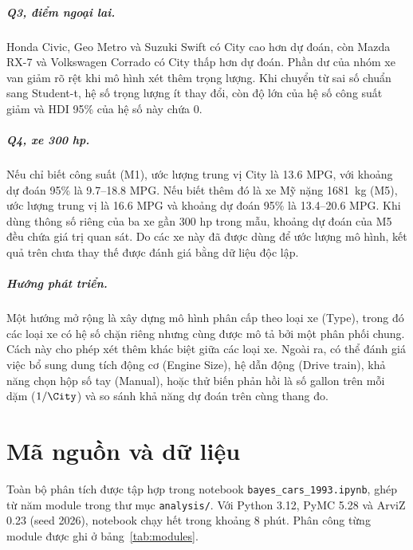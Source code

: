 \documentclass[12pt,a4paper]{report}
\begin{document}
\paragraph{Q3, điểm ngoại lai.} Honda Civic, Geo Metro và Suzuki Swift có City
cao hơn dự đoán, còn Mazda RX-7 và Volkswagen Corrado có City thấp hơn dự đoán.
Phần dư của nhóm xe van giảm rõ rệt khi mô hình xét thêm trọng lượng. Khi
chuyển từ sai số chuẩn sang Student-t, hệ số trọng lượng ít thay đổi, còn độ
lớn của hệ số công suất giảm và HDI 95\% của hệ số này chứa 0.

\paragraph{Q4, xe 300 hp.} Nếu chỉ biết công suất (M1), ước lượng trung vị City
là \num{13.6} MPG, với khoảng dự đoán 95\% là \num{9.7}--\num{18.8} MPG.
Nếu biết thêm đó là xe Mỹ nặng \SI{1681}{kg} (M5), ước lượng trung vị là
\num{16.6} MPG và khoảng dự đoán 95\% là \num{13.4}--\num{20.6} MPG. Khi dùng
thông số riêng của ba xe gần 300 hp trong mẫu, khoảng dự đoán của M5 đều chứa
giá trị quan sát. Do các xe này đã được dùng để ước lượng mô hình, kết quả trên
chưa thay thế được đánh giá bằng dữ liệu độc lập.

\paragraph{Hướng phát triển.} Một hướng mở rộng là xây dựng mô hình phân cấp theo
loại xe (Type), trong đó các loại xe có hệ số chặn riêng nhưng cùng được mô
tả bởi một phân phối chung. Cách này cho phép xét thêm khác biệt giữa các loại
xe. Ngoài ra, có thể đánh giá việc bổ sung dung tích động cơ (Engine Size), hệ
dẫn động (Drive train), khả năng chọn hộp số tay (Manual), hoặc thử biến phản
hồi là số gallon trên mỗi dặm ($1/\City$) và so sánh khả năng dự đoán trên cùng
thang đo.

\appendix

\chapter{Mã nguồn và dữ liệu}
\label{sec:appendix}

Toàn bộ phân tích được tập hợp trong notebook \texttt{bayes\_cars\_1993.ipynb},
ghép từ năm module trong thư mục \texttt{analysis/}. Với Python 3.12, PyMC 5.28
và ArviZ 0.23 (seed 2026), notebook chạy hết trong khoảng 8 phút. Phân công từng
module được ghi ở bảng~\ref{tab:modules}.
\end{document}
